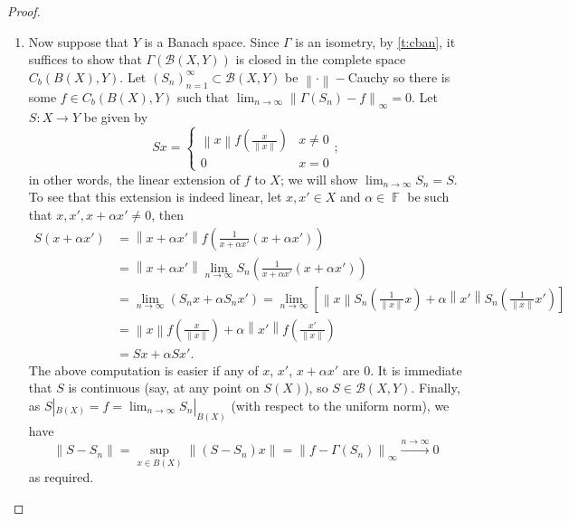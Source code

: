 \documentclass[11pt, a4paper]{memoir}
\DeclareMathOperator{\F}{{\mathbb{F}}}
\newcommand{\norm}[1]{\ensuremath{\left\lVert#1\right\rVert}}
\newcommand{\fto}[1]{\ensuremath{\xrightarrow{\scriptstyle{#1}}}}
\theoremstyle{change}
\theoremstyle{plain}
\theoremstyle{nonumberplain}
\newtheorem{proof}{Proof}
\numberwithin{equation}{section}
\begin{document}
\begin{proof}
\begin{enumerate}[nl,r]
        \item Now suppose that $Y$ is a Banach space.
            Since $\Gamma$ is an isometry, by \cref{t:cban}, it suffices to show that $\Gamma(\mathcal{B}(X,Y))$ is closed in the complete space $C_b(B(X),Y)$.
            Let $(S_n)_{n=1}^\infty\subset\mathcal{B}(X,Y)$ be $\norm{\cdot}-$Cauchy so there is some $f\in C_b(B(X),Y)$ such that $\lim_{n\to\infty}\norm{\Gamma(S_n)-f}_\infty=0$.
            Let $S:X\to Y$ be given by
            \begin{equation*}
                Sx=\begin{cases}
                    \norm{x}f\left(\frac{x}{\norm{x}}\right) & x\neq 0\\
                    0 & x=0
                \end{cases}
                ;
            \end{equation*}
            in other words, the linear extension of $f$ to $X$; we will show $\lim_{n\to\infty}S_n=S$.
            To see that this extension is indeed linear, let $x,x'\in X$ and $\alpha\in\F$ be such that $x,x',x+\alpha x'\neq 0$, then
            \begin{align*}
                S(x+\alpha x') &= \norm{x+\alpha x'}f\left(\frac{1}{x+\alpha x'}(x+\alpha x')\right)\\
                               &= \norm{x+\alpha x'}\lim_{n\to\infty} S_n\left(\frac{1}{x+\alpha x'}(x+\alpha x')\right)\\
                               &= \lim_{n\to\infty}(S_nx+\alpha S_nx')=\lim_{n\to\infty}\left[\norm{x}S_n\left(\frac{1}{\norm{x}}x\right)+\alpha\norm{x'}S_n\left(\frac{1}{\norm{x}}x'\right)\right]\\
                               &= \norm{x}f\left(\frac{x}{\norm{x}}\right)+\alpha\norm{x'}f\left(\frac{x'}{\norm{x}}\right)\\
                               &= Sx+\alpha Sx'.
            \end{align*}
            The above computation is easier if any of $x$, $x'$, $x+\alpha x'$ are 0.
            It is immediate that $S$ is continuous (say, at any point on $S(X)$), so $S\in\mathcal{B}(X,Y)$.
            Finally, as $S|_{B(X)}=f=\lim_{n\to\infty}S_n|_{B(X)}$ (with respect to the uniform norm), we have
            \begin{equation*}
                \norm{S-S_n}=\sup_{x\in B(X)}\norm{(S-S_n)x}=\norm{f-\Gamma(S_n)}_\infty\fto{n\to\infty}0
            \end{equation*}
            as required.
    \end{enumerate}
\end{proof}
\end{document}
